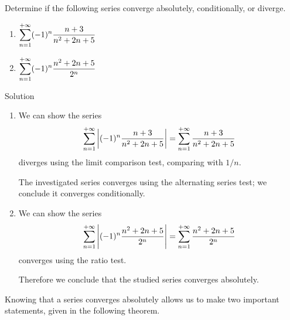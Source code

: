 \begin{example}\label{ex_alt_series2}
Determine if the following series converge absolutely, conditionally, or diverge.
\begin{multicols}{2}
\begin{enumerate}
    \item  $\displaystyle  \sum_{n=1}^{+\infty} (-1)^n\frac{n+3}{n^2+2n+5}$
    \item $\displaystyle \sum_{n=1}^{+\infty} (-1)^n\frac{n^2+2n+5}{2^n}$
\end{enumerate}
\end{multicols}


Solution 

\begin{enumerate}
	\item We can show the series $$\displaystyle \sum_{n=1}^{+\infty} \left|(-1)^n\frac{n+3}{n^2+2n+5}\right|= \sum_{n=1}^{+\infty} \frac{n+3}{n^2+2n+5}$$ diverges using the limit comparison test, comparing with $1/n$. 
	
	The investigated series  converges using the alternating series test; we conclude it converges conditionally.
	
	\item	We can show the series $$\displaystyle \sum_{n=1}^{+\infty} \left|(-1)^n\frac{n^2+2n+5}{2^n}\right|=\sum_{n=1}^{+\infty} \frac{n^2+2n+5}{2^n}$$  converges using the ratio test. 
	
	Therefore we conclude that the studied series converges absolutely.
	
\end{enumerate}
\end{example}

Knowing that a series converges absolutely allows us to make two important statements, given in the following theorem.


	\checkoddpage
{}


